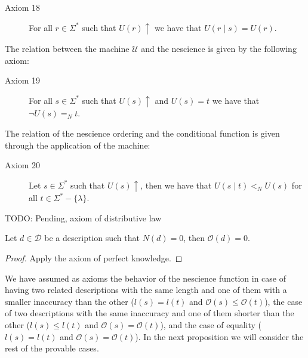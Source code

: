 \vskip 0.25cm

\begin{description}
\item[Axiom 18] For all $r \in \Sigma^\ast$ such that $U(r) \uparrow$ we have that $U(r \mid s) = U(r)$.
\end{description}

\vskip 0.25cm

The relation between the machine $\mathcal{U}$ and the nescience is given by the following axiom:

\begin{description}
\item[Axiom 19] For all $s \in \Sigma^\ast$ such that $U(s) \uparrow$ and $U(s) = t$ we have that $\lnot U(s) =_N t$.
\end{description}

\vskip 0.25cm

The relation of the nescience ordering and the conditional function is given through the application of the machine:

\begin{description}
\item[Axiom 20] Let $s \in \Sigma^\ast$ such that $U(s) \uparrow$, then we have that $U(s \mid t) <_N U(s)$ for all $t \in \Sigma^\ast-\{\lambda\}$.
\end{description}

{\color{red} TODO: Pending, axiom of distributive law}

\begin{proposition}
Let $d \in \mathcal{D}$ be a description such that $N(d)=0$, then $\mathcal{O}(d)=0$.
\end{proposition}
\begin{proof}
Apply the axiom of perfect knowledge.
\end{proof}

We have assumed as axioms the behavior of the nescience function in case of having two related descriptions with the same length and one of them with a smaller inaccuracy than the other ($l(s) = l(t)$ and $\mathcal{O} (s) \leq \mathcal{O} (t)$), the case of two descriptions with the same inaccuracy and one of them shorter than the other ($l(s) \leq l(t)$ and $\mathcal{O} (s) = \mathcal{O} (t)$), and the case of equality ($l(s) = l(t)$ and $\mathcal{O} (s) = \mathcal{O} (t)$). In the next proposition we will consider the rest of the provable cases.

